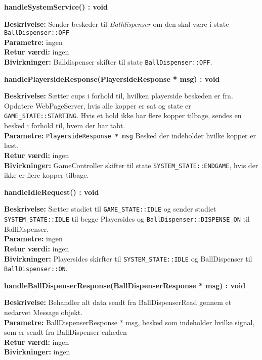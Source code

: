 \documentclass[Softwaredesign/Softwaredesign_main.tex]{subfiles}
\begin{document}
\textbf{handleSystemService() : void}
\begin{adjustwidth}{1cm}{0pt}
\textbf{Beskrivelse:} Sender beskeder til \textit{Balldispenser} om den skal være i state \lstinline{BallDispenser::OFF}\\[0.2cm]
\textbf{Parametre:} ingen \\[0.2cm]
\textbf{Retur værdi:} ingen \\[0.2cm]
\textbf{Bivirkninger:} Balldispenser skifter til state \lstinline{BallDispenser::OFF}.  \\[0.2cm]
\end{adjustwidth}

\textbf{handlePlayersideResponse(PlayersideResponse * msg) : void}
\begin{adjustwidth}{1cm}{0pt}
\textbf{Beskrivelse:} Sætter cups i forhold til, hvilken playerside beskeden er fra. Opdatere WebPageServer, hvis alle kopper er sat og state er \lstinline{GAME_STATE::STARTING}. Hvis et hold ikke har flere kopper tilbage, sendes en besked i forhold til, hvem der har tabt.  \\[0.2cm]
\textbf{Parametre:} \lstinline{PlayersideResponse * msg} Besked der indeholder hvilke kopper er læst. \\[0.2cm]
\textbf{Retur værdi:} ingen \\[0.2cm]
\textbf{Bivirkninger:} GameController skifter til state \lstinline{SYSTEM_STATE::ENDGAME}, hvis der ikke er flere kopper tilbage.  \\[0.2cm]
\end{adjustwidth}


\textbf{handleIdleRequest() : void}
\begin{adjustwidth}{1cm}{0pt}
\textbf{Beskrivelse:} Sætter stadiet til \lstinline{GAME_STATE::IDLE} og sender stadiet \lstinline{SYSTEM_STATE::IDLE} til begge Playersides og \lstinline{BallDispenser::DISPENSE_ON} til BallDispenser. \\[0.2cm]
\textbf{Parametre:} ingen \\[0.2cm]
\textbf{Retur værdi:} ingen \\[0.2cm]
\textbf{Bivirkninger:} Playersides skirfter til \lstinline{SYSTEM_STATE::IDLE} og BallDispenser til \lstinline{BallDispenser::ON}.  \\[0.2cm]
\end{adjustwidth}

\textbf{handleBallDispenserResponse(BallDispenserResponse * msg) : void}
\begin{adjustwidth}{1cm}{0pt}
\textbf{Beskrivelse:} Behandler alt data sendt fra BallDispenserRead gennem et nedarvet Message objekt. \\[0.2cm]
\textbf{Parametre:} BallDispenserResponse * msg, besked som indeholder hvilke signal, som er sendt fra BallDispenser enheden \\[0.2cm]
\textbf{Retur værdi:} ingen \\[0.2cm]
\textbf{Bivirkninger:} ingen  \\[0.2cm]
\end{adjustwidth}
\end{document}
